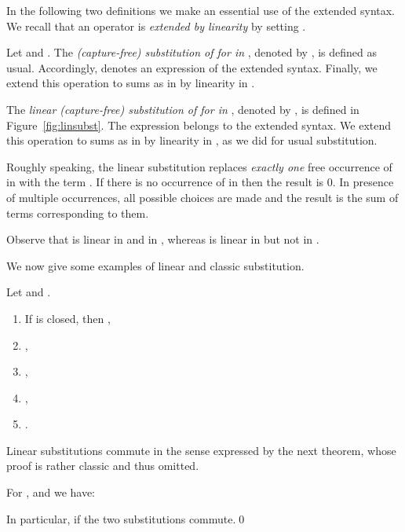 \documentclass{LMCS}
\begin{document}
{{\begin{minipage}{\linewidth}
In the following two definitions we make an essential use of the extended syntax.
We recall that an operator  is \emph{extended by linearity} by setting .

\begin{defi}[Substitution] Let  and .
The \emph{(capture-free) substitution of  for  in }, denoted by , is defined as usual.
Accordingly,   denotes an expression of the extended  syntax.
Finally, we extend this operation to sums as in  by linearity in .
\end{defi}



\begin{defi} The \emph{linear (capture-free) substitution of  for  in }, denoted by , is defined 
in Figure~\ref{fig:linsubst}.
The expression  belongs to the extended syntax. We extend this operation 
to sums as in  by linearity in , as we did for usual substitution.
\end{defi}

Roughly speaking, the linear substitution  replaces 
\emph{exactly one} free occurrence of  in  with the term .
If there is no occurrence of  in  then the result is 0.
In presence of multiple occurrences, all possible choices are made and the result is the sum of terms corresponding to them.

\begin{rem}
Observe that   is linear in  and in , 
whereas   is linear in  but not in  .
\end{rem}

We now give some examples of linear and classic substitution.

\begin{exa} Let  and .
\begin{enumerate}[1.]
\item If  is closed, then ,
\item ,
\item ,
\item ,
\item .
\end{enumerate}
\end{exa}

Linear substitutions commute in the sense expressed by the next theorem, 
whose proof is rather classic and thus omitted.

\begin{thm}\label{thm:Schwarz}
For ,  and  we have:

In particular, if  the two substitutions commute.\qed
\end{thm}


\end{minipage}}}
\end{document}
